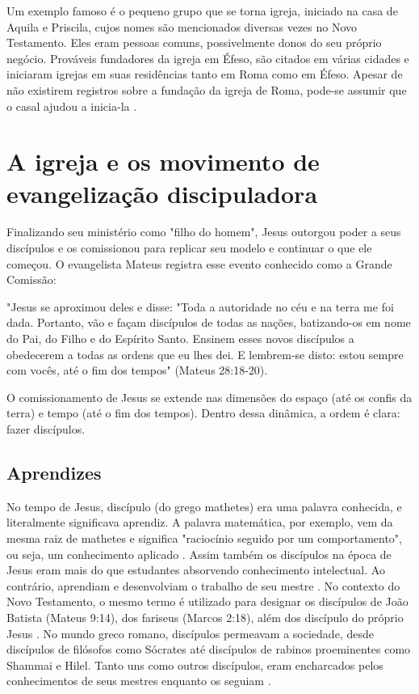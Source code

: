 \documentclass[12pt,openright,oneside,a4paper,
english,french,spanish,brazil]{abntex2}
\begin{document}
Um exemplo famoso é o pequeno grupo que se torna igreja, iniciado na casa de Aquila e Priscila, cujos nomes são mencionados diversas vezes no Novo Testamento. Eles eram pessoas comuns, possivelmente donos do seu próprio negócio. Prováveis fundadores da igreja em Éfeso, são citados em várias cidades e iniciaram igrejas em suas residências tanto em Roma como em Éfeso. Apesar de não existirem registros sobre a fundação da igreja de Roma, pode-se assumir que o casal ajudou a inicia-la \cite[p. 54]{stetzer}.

\section{A igreja e os movimento de evangelização discipuladora}

Finalizando seu ministério como "filho do homem", Jesus outorgou poder a seus discípulos e os comissionou para replicar seu modelo e continuar o que ele começou. O evangelista Mateus registra esse evento conhecido como a Grande Comissão: 

\begin{citacao}
"Jesus se aproximou deles e disse: "Toda a autoridade no céu e na terra me foi dada. Portanto, vão e façam discípulos de todas as nações, batizando-os em nome do Pai, do Filho e do Espírito Santo. Ensinem esses novos discípulos a obedecerem a todas as ordens que eu lhes dei. E lembrem-se disto: estou sempre com vocês, até o fim dos tempos" (Mateus 28:18-20).
\end{citacao}

O comissionamento de Jesus se extende nas dimensões do espaço (até os confis da terra) e tempo (até o fim dos tempos). Dentro dessa dinâmica, a ordem é clara: fazer discípulos.  

\subsection{Aprendizes} 

No tempo de Jesus, discípulo (do grego mathetes) era uma palavra conhecida, e literalmente significava aprendiz. A palavra matemática, por exemplo, vem da mesma raiz de mathetes e significa "raciocínio seguido por um comportamento", ou seja, um conhecimento aplicado \cite[p. 15]{gtsm}. Assim também os discípulos na época de Jesus eram mais do que estudantes absorvendo conhecimento intelectual. Ao contrário, aprendiam e desenvolviam o trabalho de seu mestre \cite[p. 15]{gtsm}. No contexto do Novo Testamento, o mesmo termo é utilizado para designar os discípulos de João Batista (Mateus 9:14), dos fariseus (Marcos 2:18), além dos discípulo do próprio Jesus \cite[p. 59]{brandao}. No mundo greco romano, discípulos permeavam a sociedade, desde discípulos de filósofos como Sócrates até discípulos de rabinos proeminentes como Shammai e Hilel. Tanto uns como outros discípulos, eram encharcados pelos conhecimentos de seus mestres enquanto os seguiam \cite[p. 209]{shirley}.
\end{document}
